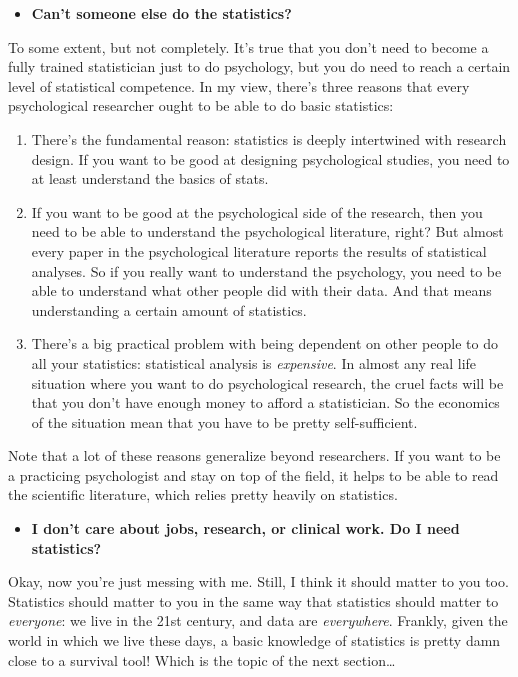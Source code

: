 \documentclass[
]{book}
\providecommand{\tightlist}{%
  \setlength{\itemsep}{0pt}\setlength{\parskip}{0pt}}
\begin{document}
\begin{itemize}
\tightlist
\item
  \textbf{Can't someone else do the statistics?}
\end{itemize}

To some extent, but not completely. It's true that you don't need to become a fully trained statistician just to do psychology, but you do need to reach a certain level of statistical competence. In my view, there's three reasons that every psychological researcher ought to be able to do basic statistics:

\begin{enumerate}
\def\labelenumi{\arabic{enumi}.}
\item
  There's the fundamental reason: statistics is deeply intertwined with research design. If you want to be good at designing psychological studies, you need to at least understand the basics of stats.
\item
  If you want to be good at the psychological side of the research, then you need to be able to understand the psychological literature, right? But almost every paper in the psychological literature reports the results of statistical analyses. So if you really want to understand the psychology, you need to be able to understand what other people did with their data. And that means understanding a certain amount of statistics.
\item
  There's a big practical problem with being dependent on other people to do all your statistics: statistical analysis is \emph{expensive}. In almost any real life situation where you want to do psychological research, the cruel facts will be that you don't have enough money to afford a statistician. So the economics of the situation mean that you have to be pretty self-sufficient.
\end{enumerate}

Note that a lot of these reasons generalize beyond researchers. If you want to be a practicing psychologist and stay on top of the field, it helps to be able to read the scientific literature, which relies pretty heavily on statistics.

\begin{itemize}
\tightlist
\item
  \textbf{I don't care about jobs, research, or clinical work. Do I need statistics?}
\end{itemize}

Okay, now you're just messing with me. Still, I think it should matter to you too. Statistics should matter to you in the same way that statistics should matter to \emph{everyone}: we live in the 21st century, and data are \emph{everywhere}. Frankly, given the world in which we live these days, a basic knowledge of statistics is pretty damn close to a survival tool! Which is the topic of the next section\ldots{}
\end{document}
